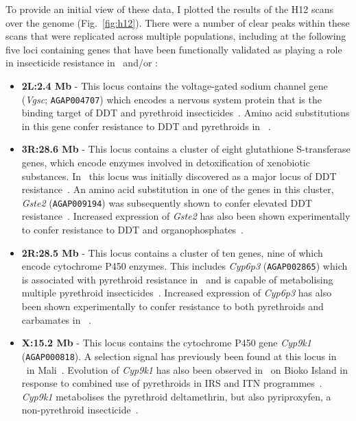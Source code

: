 \documentclass[a4paper,11pt,abstracton,hidelinks]{scrartcl}
\begin{document}
To provide an initial view of these data, I plotted the results of the H12 scans over the genome (Fig.~\ref{fig:h12}).
%
There were a number of clear peaks within these scans that were replicated across multiple populations, including at the following five loci containing genes that have been functionally validated as playing a role in insecticide resistance in \agam\ and/or \acol:
%
\begin{itemize}
\item \textbf{2L:2.4 Mb} - This locus contains the voltage-gated sodium channel gene (\textit{Vgsc}; \texttt{AGAP004707}) which encodes a nervous system protein that is the binding target of DDT and pyrethroid insecticides~\parencite{Dong2014}.
%
Amino acid substitutions in this gene confer resistance to DDT and pyrethroids in \agam~\parencite{MartinezTorres1998,Ranson2000a,Davies2007,Lynd2010,Jones2012,Wang2015}.
\item \textbf{3R:28.6 Mb} - This locus contains a cluster of eight glutathione S-transferase genes, which encode enzymes involved in detoxification of xenobiotic substances.
%
In \agam\ this locus was initially discovered as a major locus of DDT resistance~\parencite{Prapanthadara1993,Ranson2000b,Ranson2001,Ding2003}.
%
An amino acid substitution in one of the genes in this cluster, \textit{Gste2} (\texttt{AGAP009194}) was subsequently shown to confer elevated DDT resistance~\parencite{Mitchell2014}.
%
Increased expression of \textit{Gste2} has also been shown experimentally to confer resistance to DDT and organophosphates~\parencite{Adolfi2019}.
\item \textbf{2R:28.5 Mb} - This locus contains a cluster of ten genes, nine of which encode cytochrome P450 enzymes.
%
This includes \textit{Cyp6p3} (\texttt{AGAP002865}) which is associated with pyrethroid resistance in \agam\ and is capable of metabolising multiple pyrethroid insecticides~\parencite{Muller2008}.
%
Increased expression of \textit{Cyp6p3} has also been shown experimentally to confer resistance to both pyrethroids and carbamates in \agam~\parencite{Adolfi2019}.
\item \textbf{X:15.2 Mb} - This locus contains the cytochrome P450 gene \textit{Cyp9k1} (\texttt{AGAP000818}).
%
A selection signal has previously been found at this locus in \acol\ in Mali~\parencite{Main2015}.
%
Evolution of \textit{Cyp9k1} has also been observed in \acol\ on Bioko Island in response to combined use of pyrethroids in IRS and ITN programmes~\parencite{Vontas2018}.
%
\textit{Cyp9k1} metabolises the pyrethroid deltamethrin, but also pyriproxyfen, a non-pyrethroid insecticide~\parencite{Vontas2018}.

\end{itemize}
\end{document}
